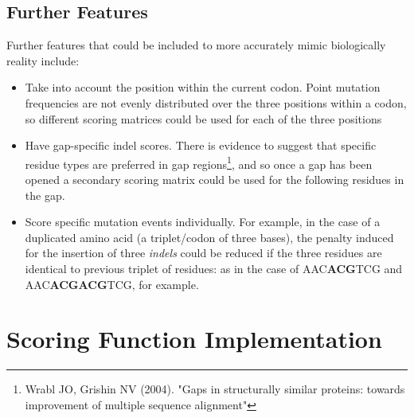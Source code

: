 \documentclass[a4paper]{article}
\begin{document}
\subsection{Further Features}
Further features that could be included to more accurately mimic biologically reality include:
\begin{itemize}
\item Take into account the position within the current codon. Point mutation frequencies are not evenly distributed over the three positions within a codon, so different scoring matrices could be used for each of the three positions
\item Have gap-specific indel scores. There is evidence to suggest that specific residue types are preferred in gap regions\footnote{Wrabl JO, Grishin NV (2004). "Gaps in structurally similar proteins: towards improvement of multiple sequence alignment" }, and so once a gap has been opened a secondary scoring matrix could be used for the following residues in the gap.
\item Score specific mutation events individually. For example, in the case of a duplicated amino acid (a triplet/codon of three bases), the penalty induced for the insertion of three \textit{indels} could be reduced if the three residues are identical to previous triplet of residues: as in the case of AAC\textbf{ACG}TCG and AAC\textbf{ACGACG}TCG, for example. 

\end{itemize}

\section{Scoring Function Implementation}
\end{document}
